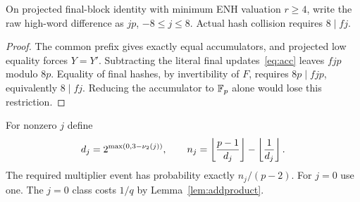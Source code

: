 \begin{lemma}\label{lem:8p}
On projected final-block identity with minimum ENH valuation $r\ge4$, write the raw high-word difference as $jp$, $-8\le j\le8$. Actual hash collision requires $8\mid fj$.
\end{lemma}
\begin{proof}
The common prefix gives exactly equal accumulators, and projected low equality forces $Y=Y'$. Subtracting the literal final updates~\eqref{eq:acc} leaves $fjp$ modulo $8p$. Equality of final hashes, by invertibility of $F$, requires $8p\mid fjp$, equivalently $8\mid fj$. Reducing the accumulator to $\mathbb F_p$ alone would lose this restriction.
\end{proof}
For nonzero $j$ define
\begin{equation}\label{eq:nj}
 d_j=2^{\max(0,3-\nu_2(j))},\qquad
 n_j=\left\lfloor\frac{p-1}{d_j}\right\rfloor-\left\lfloor\frac1{d_j}\right\rfloor.
\end{equation}
The required multiplier event has probability exactly $n_j/(p-2)$. For $j=0$ use one. The $j=0$ class costs $1/q$ by Lemma~\ref{lem:addproduct}.

